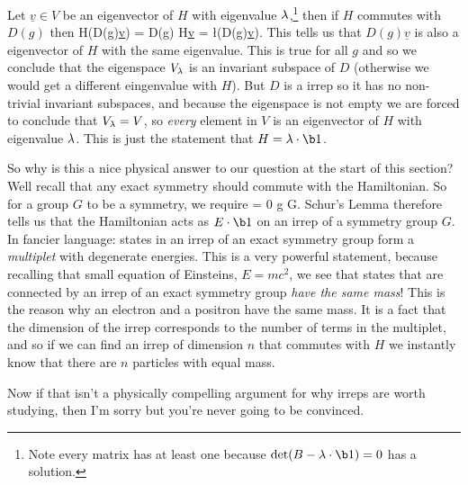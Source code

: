 \bq 
    Let $\underline{v}\in V$ be an eigenvector of $H$ with eigenvalue $\lambda$,\footnote{Note every matrix has at least one because $\det (B - \l\cdot \b1) = 0$ has a solution.} then if $H$ commutes with $D(g)$ then 
    \bse 
        H\big(D(g)\underline{v}\big) = D(g) H\underline{v} = \l \cdot \big(D(g)\underline{v}\big).
    \ese
    This tells us that $D(g)\underline{v}$ is also a eigenvector of $H$ with the same eigenvalue. This is true for all $g$ and so we conclude that the eigenspace $V_{\lambda}$ is an invariant subspace of $D$ (otherwise we would get a different eingenvalue with $H$). But $D$ is a irrep so it has no non-trivial invariant subspaces, and because the eigenspace is not empty we are forced to conclude that $V_{\lambda} = V$, so \textit{every} element in $V$ is an eigenvector of $H$ with eigenvalue $\lambda$. This is just the statement that $H = \l \cdot \b1$.
\eq 

So why is this a nice physical answer to our question at the start of this section? Well recall that any exact symmetry should commute with the Hamiltonian. So for a group $G$ to be a symmetry, we require 
\bse 
    [H,D(g)] = 0 \qquad \forall g \in G.
\ese 
Schur's Lemma therefore tells us that the Hamiltonian acts as $E\cdot \b1$ on an irrep of a symmetry group $G$. In fancier language: states in an irrep of an exact symmetry group form a \textit{multiplet} with degenerate energies. This is a very powerful statement, because recalling that small equation of Einsteins, $E=mc^2$, we see that states that are connected by an irrep of an exact symmetry group \textit{have the same mass}! This is the reason why an electron and a positron have the same mass. It is a fact that the dimension of the irrep corresponds to the number of terms in the multiplet, and so if we can find an irrep of dimension $n$ that commutes with $H$ we instantly know that there are $n$ particles with equal mass. 

Now if that isn't a physically compelling argument for why irreps are worth studying, then I'm sorry but you're never going to be convinced. 
